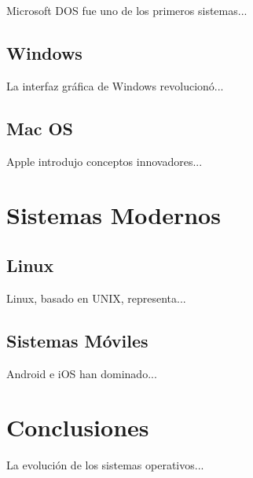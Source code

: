 \documentclass[12pt,a4paper]{article}
\begin{document}
Microsoft DOS fue uno de los primeros sistemas...

\subsection{Windows}

La interfaz gráfica de Windows revolucionó...

\subsection{Mac OS}

Apple introdujo conceptos innovadores...

\section{Sistemas Modernos}

\subsection{Linux}

Linux, basado en UNIX, representa...

\subsection{Sistemas Móviles}

Android e iOS han dominado...

\section{Conclusiones}

La evolución de los sistemas operativos...



\end{document}
